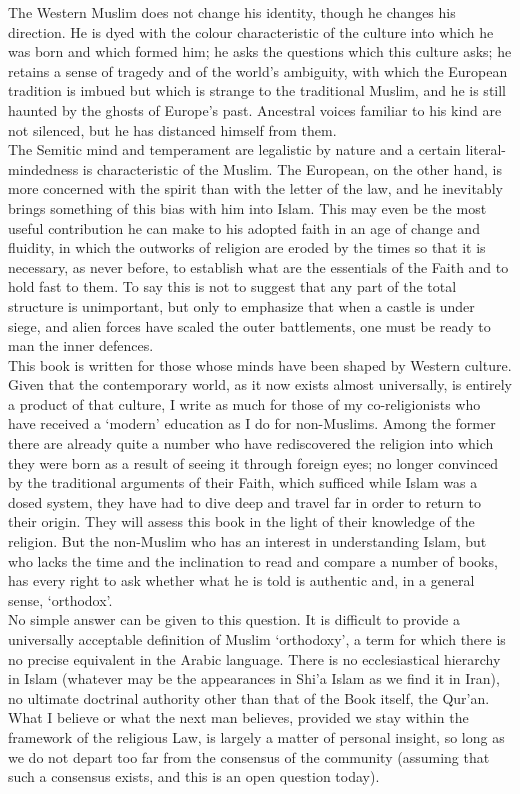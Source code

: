 \documentclass[10pt, twoside,openright]{book}
\begin{document}
The Western Muslim does not change his identity, though he changes his direction. He is dyed with the colour characteristic of the culture into which he was born and which formed him; he asks the questions which this culture asks; he retains a sense of tragedy and of the world's ambiguity, with which the European tradition is imbued but which is strange to the traditional Muslim, and he is still haunted by the ghosts of Europe's past. Ancestral voices familiar to his kind are not silenced, but he has distanced himself from them. \\

The Semitic mind and temperament are legalistic by nature and a certain literal\hyp{}mindedness is characteristic of the Muslim. The European, on the other hand, is more concerned with the spirit than with the letter of the law, and he inevitably brings something of this bias with him into Islam. This may even be the most useful contribution he can make to his adopted faith in an age of change and fluidity, in which the outworks of religion are eroded by the times so that it is necessary, as never before, to establish what are the essentials of the Faith and to hold fast to them. To say this is not to suggest that any part of the total structure is unimportant, but only to emphasize that when a castle is under siege, and alien forces have scaled the outer battlements, one must be ready to man the inner defences. \\

This book is written for those whose minds have been shaped by Western culture. Given that the contemporary world, as it now exists almost universally, is entirely a product of that culture, I write as much for those of my co\hyp{}religionists who have received a `modern' education as I do for non\hyp{}Muslims. Among the former there are already quite a number who have rediscovered the religion into which they were born as a result of seeing it through foreign eyes; no longer convinced by the traditional arguments of their Faith, which sufficed while Islam was a dosed system, they have had to dive deep and travel far in order to return to their origin. They will assess this book in the light of their knowledge of the religion. But the non\hyp{}Muslim who has an interest in understanding Islam, but who lacks the time and the inclination to read and compare a number of books, has every right to ask whether what he is told is authentic and, in a general sense, `orthodox'. \\

No simple answer can be given to this question. It is difficult to provide a universally acceptable definition of Muslim `orthodoxy', a term for which there is no precise equivalent in the Arabic language. There is no ecclesiastical hierarchy in Islam (whatever may be the appearances in Shi'a Islam as we find it in Iran), no ultimate doctrinal authority other than that of the Book itself, the Qur'an. What I believe or what the next man believes, provided we stay within the framework of the religious Law, is largely a matter of personal insight, so long as we do not depart too far from the consensus of the community (assuming that such a consensus exists, and this is an open question today). \\
\end{document}
